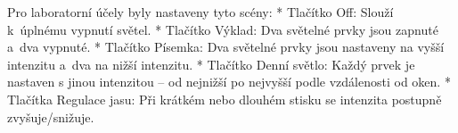 \medskip
\noindent
{\sbf Pro laboratorní účely byly nastaveny tyto scény:}
\begitems
    * Tlačítko {\sbf Off:} Slouží k~úplnému vypnutí světel.
    * Tlačítko {\sbf Výklad:} Dva světelné prvky jsou zapnuté a~dva vypnuté.
    * Tlačítko {\sbf Písemka:} Dva světelné prvky jsou nastaveny na vyšší intenzitu a~dva na nižší intenzitu.
    * Tlačítko {\sbf Denní světlo:} Každý prvek je nastaven s jinou intenzitou -- od nejnižší po nejvyšší podle vzdálenosti od oken.
    * Tlačítka {\sbf Regulace jasu:} Při krátkém nebo dlouhém stisku se intenzita postupně zvyšuje/snižuje.
\enditems







